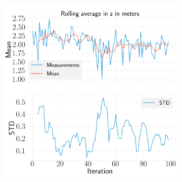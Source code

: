 \documentclass[../Head/report.tex]{subfiles}
\begin{document}
\begin{figure}[H]
\begin{subfigure}[t]{.30\textwidth}
        \caption{}
        \label{fig:rolling_average_in_y_test2}
    \end{subfigure}
     \hspace{0.2em}
    \begin{subfigure}[t]{.30\textwidth}
        \centering
        \includegraphics[width=\textwidth]{../Figures/analyse_rolling_average/test2/Calculated_rolling_average_in_z_with_mean_and_STD.png}
        \caption{}
        \label{fig:rolling_average_in_z_test2}
    \end{subfigure}
    \caption{}
    \label{fig:rolling_average_pos_test2}
\end{figure}
\end{document}
